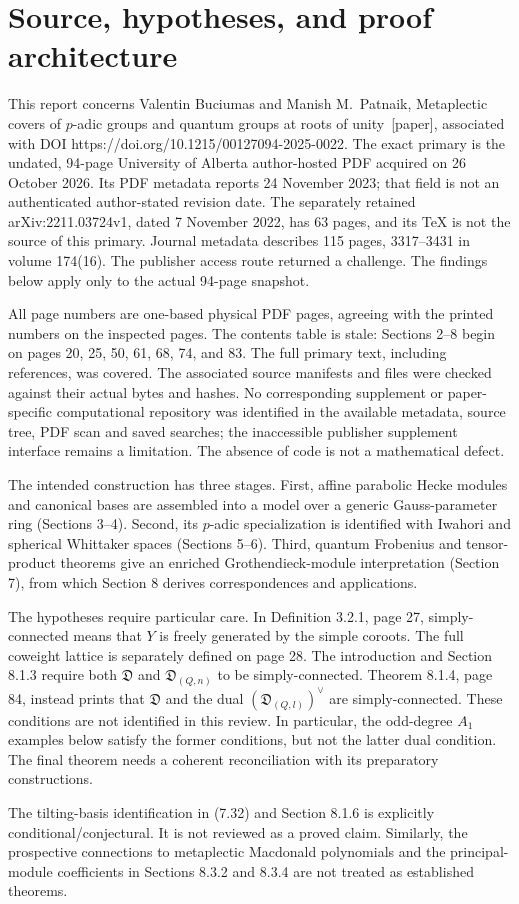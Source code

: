 \documentclass[10pt]{article}
\begin{document}
\section*{Source, hypotheses, and proof architecture}
This report concerns Valentin Buciumas and Manish M. Patnaik, Metaplectic covers of \(p\)-adic groups and quantum groups at roots of unity [paper], associated with DOI https://doi.org/10.1215/00127094-2025-0022. The exact primary is the undated, 94-page University of Alberta author-hosted PDF acquired on 26 October 2026. Its PDF metadata reports 24 November 2023; that field is not an authenticated author-stated revision date. The separately retained arXiv:2211.03724v1, dated 7 November 2022, has 63 pages, and its TeX is not the source of this primary. Journal metadata describes 115 pages, 3317–3431 in volume 174(16). The publisher access route returned a challenge. The findings below apply only to the actual 94-page snapshot.\par
All page numbers are one-based physical PDF pages, agreeing with the printed numbers on the inspected pages. The contents table is stale: Sections 2–8 begin on pages 20, 25, 50, 61, 68, 74, and 83. The full primary text, including references, was covered. The associated source manifests and files were checked against their actual bytes and hashes. No corresponding supplement or paper-specific computational repository was identified in the available metadata, source tree, PDF scan and saved searches; the inaccessible publisher supplement interface remains a limitation. The absence of code is not a mathematical defect.\par
The intended construction has three stages. First, affine parabolic Hecke modules and canonical bases are assembled into a model over a generic Gauss-parameter ring (Sections 3–4). Second, its \(p\)-adic specialization is identified with Iwahori and spherical Whittaker spaces (Sections 5–6). Third, quantum Frobenius and tensor-product theorems give an enriched Grothendieck-module interpretation (Section 7), from which Section 8 derives correspondences and applications.\par
The hypotheses require particular care. In Definition 3.2.1, page 27, simply-connected means that \(Y\) is freely generated by the simple coroots. The full coweight lattice is separately defined on page 28. The introduction and Section 8.1.3 require both \(\mathfrak D\) and \(\mathfrak D_{(Q,n)}\) to be simply-connected. Theorem 8.1.4, page 84, instead prints that \(\mathfrak D\) and the dual \((\mathfrak D_{(Q,l)})^\vee\) are simply-connected. These conditions are not identified in this review. In particular, the odd-degree \(A_1\) examples below satisfy the former conditions, but not the latter dual condition. The final theorem needs a coherent reconciliation with its preparatory constructions.\par
The tilting-basis identification in (7.32) and Section 8.1.6 is explicitly conditional/conjectural. It is not reviewed as a proved claim. Similarly, the prospective connections to metaplectic Macdonald polynomials and the principal-module coefficients in Sections 8.3.2 and 8.3.4 are not treated as established theorems.\par
\end{document}
